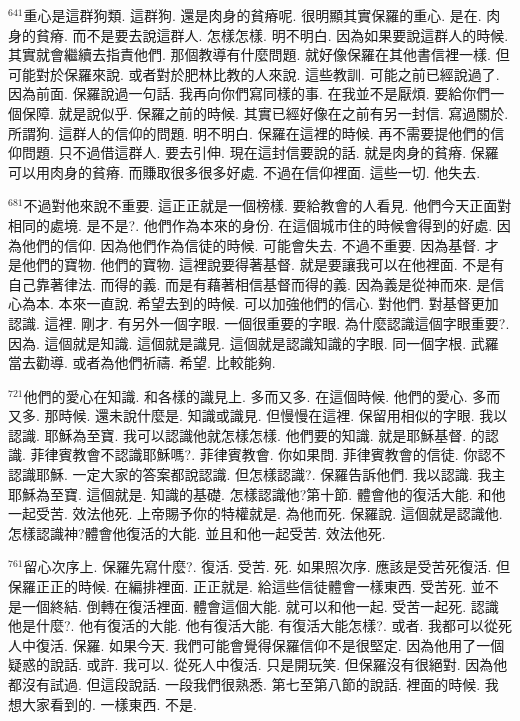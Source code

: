 \documentclass{book}
\begin{document}
$^{641}$重心是這群狗類.
這群狗.
還是肉身的貧瘠呢.
很明顯其實保羅的重心.
是在.
肉身的貧瘠.
而不是要去說這群人.
怎樣怎樣.
明不明白.
因為如果要說這群人的時候.
其實就會繼續去指責他們.
那個教導有什麼問題.
就好像保羅在其他書信裡一樣.
但可能對於保羅來說.
或者對於肥林比教的人來說.
這些教訓.
可能之前已經說過了.
因為前面.
保羅說過一句話.
我再向你們寫同樣的事.
在我並不是厭煩.
要給你們一個保障.
就是說似乎.
保羅之前的時候.
其實已經好像在之前有另一封信.
寫過關於.
所謂狗.
這群人的信仰的問題.
明不明白.
保羅在這裡的時候.
再不需要提他們的信仰問題.
只不過借這群人.
要去引伸.
現在這封信要說的話.
就是肉身的貧瘠.
保羅可以用肉身的貧瘠.
而賺取很多很多好處.
不過在信仰裡面.
這些一切.
他失去.

$^{681}$不過對他來說不重要.
這正正就是一個榜樣.
要給教會的人看見.
他們今天正面對相同的處境.
是不是?.
他們作為本來的身份.
在這個城市住的時候會得到的好處.
因為他們的信仰.
因為他們作為信徒的時候.
可能會失去.
不過不重要.
因為基督.
才是他們的寶物.
他們的寶物.
這裡說要得著基督.
就是要讓我可以在他裡面.
不是有自己靠著律法.
而得的義.
而是有藉著相信基督而得的義.
因為義是從神而來.
是信心為本.
本來一直說.
希望去到的時候.
可以加強他們的信心.
對他們.
對基督更加認識.
這裡.
剛才.
有另外一個字眼.
一個很重要的字眼.
為什麼認識這個字眼重要?.
因為.
這個就是知識.
這個就是識見.
這個就是認識知識的字眼.
同一個字根.
武羅當去勸導.
或者為他們祈禱.
希望.
比較能夠.

$^{721}$他們的愛心在知識.
和各樣的識見上.
多而又多.
在這個時候.
他們的愛心.
多而又多.
那時候.
還未說什麼是.
知識或識見.
但慢慢在這裡.
保留用相似的字眼.
我以認識.
耶穌為至寶.
我可以認識他就怎樣怎樣.
他們要的知識.
就是耶穌基督.
的認識.
菲律賓教會不認識耶穌嗎?.
菲律賓教會.
你如果問.
菲律賓教會的信徒.
你認不認識耶穌.
一定大家的答案都說認識.
但怎樣認識?.
保羅告訴他們.
我以認識.
我主耶穌為至寶.
這個就是.
知識的基礎.
怎樣認識他?第十節.
體會他的復活大能.
和他一起受苦.
效法他死.
上帝賜予你的特權就是.
為他而死.
保羅說.
這個就是認識他.
怎樣認識神?體會他復活的大能.
並且和他一起受苦.
效法他死.

$^{761}$留心次序上.
保羅先寫什麼?.
復活.
受苦.
死.
如果照次序.
應該是受苦死復活.
但保羅正正的時候.
在編排裡面.
正正就是.
給這些信徒體會一樣東西.
受苦死.
並不是一個終結.
倒轉在復活裡面.
體會這個大能.
就可以和他一起.
受苦一起死.
認識他是什麼?.
他有復活的大能.
他有復活大能.
有復活大能怎樣?.
或者.
我都可以從死人中復活.
保羅.
如果今天.
我們可能會覺得保羅信仰不是很堅定.
因為他用了一個疑惑的說話.
或許.
我可以.
從死人中復活.
只是開玩笑.
但保羅沒有很絕對.
因為他都沒有試過.
但這段說話.
一段我們很熟悉.
第七至第八節的說話.
裡面的時候.
我想大家看到的.
一樣東西.
不是.
\end{document}
